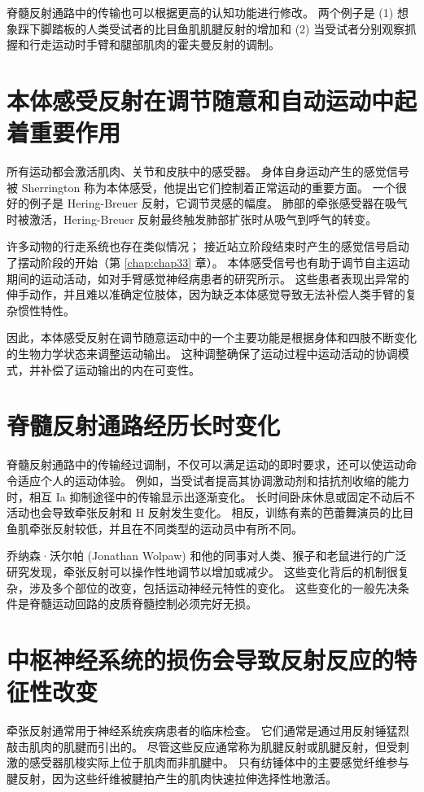 脊髓反射通路中的传输也可以根据更高的认知功能进行修改。 两个例子是 (1) 想象踩下脚踏板的人类受试者的比目鱼肌肌腱反射的增加和 (2) 当受试者分别观察抓握和行走运动时手臂和腿部肌肉的霍夫曼反射的调制。


\section{本体感受反射在调节随意和自动运动中起着重要作用}
所有运动都会激活肌肉、关节和皮肤中的感受器。 身体自身运动产生的感觉信号被 Sherrington 称为本体感受，他提出它们控制着正常运动的重要方面。 一个很好的例子是 Hering-Breuer 反射，它调节灵感的幅度。 肺部的牵张感受器在吸气时被激活，Hering-Breuer 反射最终触发肺部扩张时从吸气到呼气的转变。

许多动物的行走系统也存在类似情况； 接近站立阶段结束时产生的感觉信号启动了摆动阶段的开始（第 \ref{chap:chap33} 章）。 本体感受信号也有助于调节自主运动期间的运动活动，如对手臂感觉神经病患者的研究所示。 这些患者表现出异常的伸手动作，并且难以准确定位肢体，因为缺乏本体感觉导致无法补偿人类手臂的复杂惯性特性。

因此，本体感受反射在调节随意运动中的一个主要功能是根据身体和四肢不断变化的生物力学状态来调整运动输出。 这种调整确保了运动过程中运动活动的协调模式，并补偿了运动输出的内在可变性。


\section{脊髓反射通路经历长时变化}
脊髓反射通路中的传输经过调制，不仅可以满足运动的即时要求，还可以使运动命令适应个人的运动体验。 例如，当受试者提高其协调激动剂和拮抗剂收缩的能力时，相互 Ia 抑制途径中的传输显示出逐渐变化。 长时间卧床休息或固定不动后不活动也会导致牵张反射和 H 反射发生变化。 相反，训练有素的芭蕾舞演员的比目鱼肌牵张反射较低，并且在不同类型的运动员中有所不同。

乔纳森·沃尔帕 (Jonathan Wolpaw) 和他的同事对人类、猴子和老鼠进行的广泛研究发现，牵张反射可以操作性地调节以增加或减少。 这些变化背后的机制很复杂，涉及多个部位的改变，包括运动神经元特性的变化。 这些变化的一般先决条件是脊髓运动回路的皮质脊髓控制必须完好无损。


\section{中枢神经系统的损伤会导致反射反应的特征性改变}
牵张反射通常用于神经系统疾病患者的临床检查。 它们通常是通过用反射锤猛烈敲击肌肉的肌腱而引出的。 尽管这些反应通常称为肌腱反射或肌腱反射，但受刺激的感受器肌梭实际上位于肌肉而非肌腱中。 只有纺锤体中的主要感觉纤维参与腱反射，因为这些纤维被腱拍产生的肌肉快速拉伸选择性地激活。

